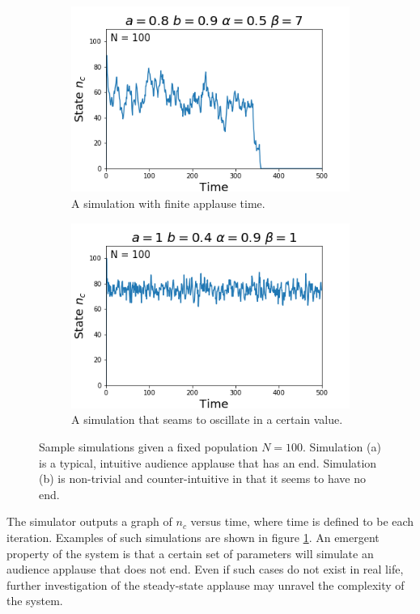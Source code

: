 \dimendef{}
\begin{figure}[h!]
  \centering
  \begin{subfigure}[b]{0.4\linewidth}
    \includegraphics[width=\linewidth]{images/chapter2/simA.png}
    \caption{A simulation with finite applause time.}
  \end{subfigure}
  \begin{subfigure}[b]{0.4\linewidth}
    \includegraphics[width=\linewidth]{images/chapter2/simB.png}
    \caption{A simulation that seams to oscillate in a certain value.}
  \end{subfigure}
  \caption{Sample simulations given a fixed population $N = 100$. Simulation (a) is a typical, intuitive audience applause that has an end. Simulation (b) is non-trivial and counter-intuitive in that it seems to have no end.}
  \label{fig:simulations}
\end{figure}




The simulator outputs a graph of $n_{c}$ versus time, where time is defined to be each iteration.
Examples of such simulations are shown in figure \ref{fig:simulations}.
An emergent property of the system is that a certain set of parameters will simulate an audience applause that does not end.
Even if such cases do not exist in real life, further investigation of the steady-state applause may unravel the complexity of the system.


